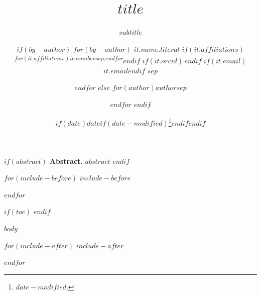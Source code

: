 \documentclass[fontset=fandol,$if(fontsize)$$fontsize$$endif$]{\mydocumentclass}
\title{$title$}
\subtitle{$subtitle$}
\author{
$if(by-author)$%
$for(by-author)$%
$it.name.literal$%
$if(it.affiliations)$\textsuperscript{$for(it.affiliations)$$it.number$$sep$,$endfor$}$endif$%
$if(it.orcid)$\,\orcidlink{$it.orcid$}$endif$%
$if(it.email)$\\ \texttt{$it.email$}$endif$%
$sep$ \and%
$endfor$%
$else$%
$for(author)$$author$$sep$ \and $endfor$%
$endif$%
}
\date{$if(date)$$date$$if(date-modified)$\thanks{\transmodified \space $date-modified$.}$endif$$endif$}
\renewenvironment{abstract}{\zihao{-5} \textbf{摘要} \kaishu}{}
\renewenvironment{abstract}{\noindent \small \textbf{Abstract.}}{}
\theoremstyle{suncnthm}
\theoremstyle{definition}
\theoremstyle{remark}
\begin{document}
\maketitle

$if(abstract)$
\begin{abstract}
    $abstract$
\end{abstract}
$endif$

$for(include-before)$
$include-before$

$endfor$

$if(toc)$
\renewcommand*\contentsname{\transtoc}
\setcounter{tocdepth}{$toc-depth$ - 1} %
\tableofcontents
$endif$

$body$

\ifzh
  \printbibliography[title={参考文献}]
\else
  \printbibliography
\fi

$for(include-after)$
$include-after$

$endfor$
\end{document}
